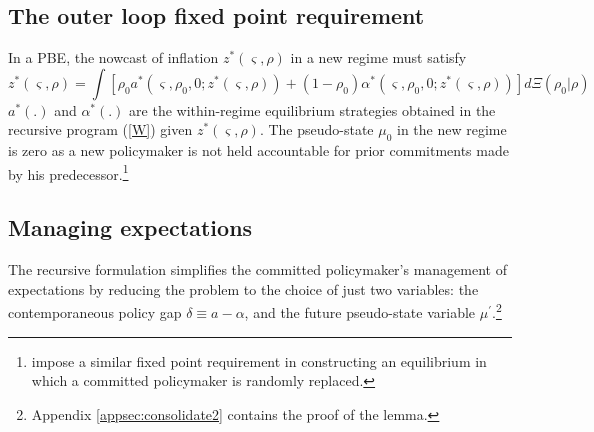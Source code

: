 \documentclass[12pt,letter,leqno]{article}
\theoremstyle{asn}
\theoremstyle{lem}
\theoremstyle{slem}
\theoremstyle{prop}
\theoremstyle{appprop}
\theoremstyle{rem}
\theoremstyle{defn}
\begin{document}
\subsection{The outer loop fixed point requirement}\label{sec:z}

In a PBE, the nowcast of inflation $z^*(\varsigma ,\rho )$ in a new regime must satisfy
\begin{equation}
z^*(\varsigma ,\rho) =\int [\rho _{0}a^*( \varsigma ,\rho
_{0},0;z^*(\varsigma ,\rho)) +( 1-\rho _{0}) \alpha ^*( \varsigma
,\rho _{0},0;z^*(\varsigma ,\rho))]d\Xi(\rho_0|\rho)
\label{z}
\end{equation}%
$a^{\ast }(.)$ and $\alpha ^{\ast }(.)$ are the within-regime equilibrium strategies obtained in the recursive program (\ref{W}) given $z^{\ast
}(\varsigma ,\rho )$. The pseudo-state $\mu_0$ in the new regime is zero as a new policymaker is not held accountable for prior commitments made by his predecessor.\footnote{\cite{schaumburg_investigation_2007} impose a similar fixed point requirement in constructing an equilibrium in which a committed policymaker is randomly replaced.}


\subsection{Managing expectations}
The recursive formulation simplifies the committed policymaker’s management of expectations by reducing the problem to the choice of just two variables: the contemporaneous policy gap $\delta \equiv a-\alpha $, and the future pseudo-state
variable $\mu ^{\prime }$.\footnote{Appendix \ref{appsec:consolidate2} contains the proof of the lemma.}
\end{document}
